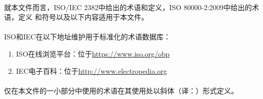 \paragraph{}
就本文件而言，ISO/IEC 2382中给出的术语和定义，ISO 80000-2:2009中给出的术语，定义
和符号以及以下内容适用于本文件。

\paragraph{}
ISO和IEC在以下地址维护用于标准化的术语数据库：
\begin{enumerate}
  \item ISO在线浏览平台：位于\href{https://www.iso.org/obp}
        {https://www.iso.org/obp}
  \item IEC电子百科：位于\href{http://www.electropedia.org}
        {http://www.electropedia.org}
\end{enumerate}

\paragraph{}
仅在本文件的一小部分中使用的术语在其使用处以斜体（译：）形式定义。
